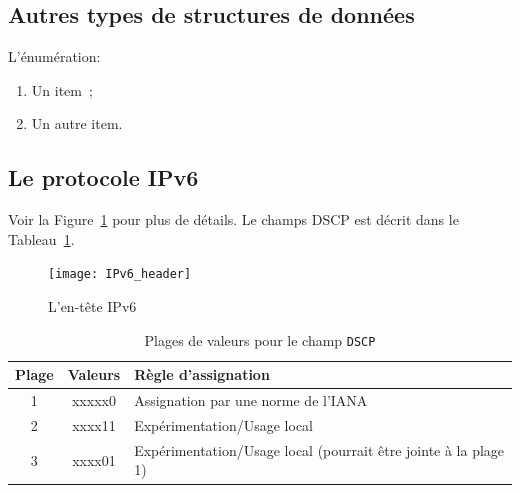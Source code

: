 \subsection{Autres types de structures de données}
L'énumération:
\begin{enumerate}
\item Un item~;
\item Un autre item.
\end{enumerate}


\subsection{Le protocole IPv6}
Voir la Figure~\ref{fig:IPv6} pour plus de détails. Le champs DSCP est
décrit dans le Tableau~\ref{tab:RangesDSCP}.

\begin{figure}[htb]
\centering
\texttt{[image: IPv6\_header]}
\caption{L'en-tête IPv6}
\label{fig:IPv6}
\end{figure}

\begin{table}[htb]
\caption{Plages de valeurs pour le champ \texttt{DSCP}}
\centering
\begin{tabular}{|c|c|l|}
\hline\rowcolor[gray]{0.8}\color{black}
Plage & Valeurs & Règle d'assignation\\\hline
1 & xxxxx0 & Assignation par une norme de l'IANA\\\hline
2 & xxxx11 & Expérimentation/Usage local\\\hline
3 & xxxx01 & Expérimentation/Usage local (pourrait être jointe à la plage 1)\\\hline
\end{tabular}
\label{tab:RangesDSCP}
\end{table}

\FloatBarrier


